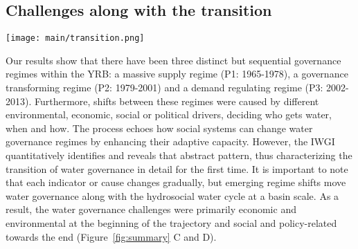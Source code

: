\subsection{Challenges along with the transition}

\begin{figure*}[htbp!]
	\centering
	\texttt{[image: main/transition.png]}
	\caption{
		Transition schema of water governance during transformation towards a hydrosocial water cycle. The natural water cycle dominates blue pathways while socio-economic feedback dominate red pathways. Finally, there is a transformation towards the hydrosocial water cycle where red loop increases.
		\textbf{A. Early phase.} As socio-economic systems develop, industry and services gradually demand increasing amounts of water; at the same time, increasing social organization and technological capacity allow people to manage water resources more intensively, including intensive intervention in the natural water cycle.
		\textbf{B. Late phase} With further developed and economically efficient industries and services, trade-offs between provisioning-purpose and non-provisioning water use become prominent. Rather than being determined by local socio-economic systems, water withdraws and management are scaled up to the entire basin.
		Thus, \textbf{C. Transformation from a natural water cycle towards the hydro-social water cycle} occurs in paralleled with a transformation towards a hydrosocial water cycle. This is generally distinguished when it reaches water resource limits. The three water governance regimes seen in the YRB are identified along this transition (Regime 1: massive supply regime, Regime 2: purpose-focused regime, Regime 3: many-sided governance regime).
		\textbf{D. Water governance challenges} Through the transitional regimes, water governance faces primarily economic and environmental challenges in the early phase and social and policy challenges in the late phase.
	}
	\label{fig:summary}
\end{figure*}

Our results show that there have been three distinct but sequential governance regimes within the YRB: a massive supply regime (P1: 1965-1978), a governance transforming regime (P2: 1979-2001) and a demand regulating regime (P3: 2002-2013).
Furthermore, shifts between these regimes were caused by different environmental, economic, social or political drivers, deciding who gets water, when and how.
The process echoes how social systems can change water governance regimes by enhancing their adaptive capacity. %
However, the IWGI quantitatively identifies and reveals that abstract pattern, thus characterizing the transition of water governance in detail for the first time.
It is important to note that each indicator or cause changes gradually, but emerging regime shifts move water governance along with the hydrosocial water cycle at a basin scale.
As a result, the water governance challenges were primarily economic and environmental at the beginning of the trajectory and social and policy-related towards the end (Figure~\ref{fig:summary} C and D).

